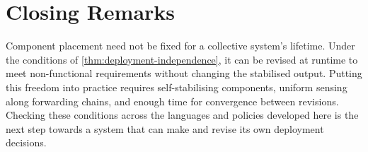 
\section{Closing Remarks}
\label{sec:closing-remarks}

Component placement need not be fixed for a collective system's lifetime.
Under the conditions of \cref{thm:deployment-independence},
it can be revised at runtime to meet non-functional requirements without changing the stabilised output.
Putting this freedom into practice requires self-stabilising components,
uniform sensing along forwarding chains, and enough time for convergence between revisions.
Checking these conditions across the languages and policies developed here
is the next step towards a system that can make and revise its own deployment decisions.
